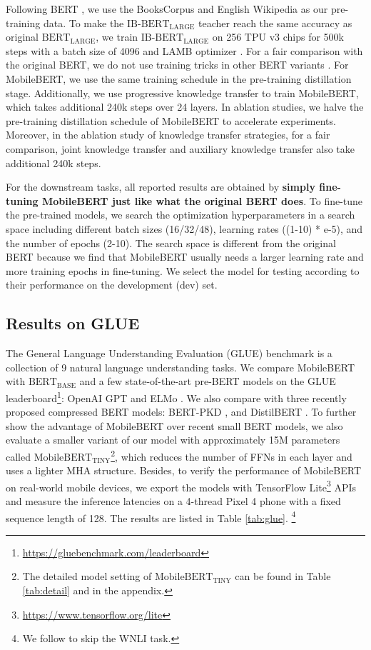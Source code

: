 \documentclass[11pt,a4paper]{article}
\begin{document}
Following BERT \citep{devlin2018bert}, we use the BooksCorpus \citep{zhu2015aligning} and English Wikipedia as our pre-training data. To make the $\text{IB-BERT}_\text{LARGE}$ teacher reach the same accuracy as original $\text{BERT}_\text{LARGE}$, we train $\text{IB-BERT}_\text{LARGE}$ on 256 TPU v3 chips for 500k steps with a batch size of 4096 and LAMB optimizer \citep{you2019large}. For a fair comparison with the original BERT, we do not use training tricks in other BERT variants \citep{liu2019roberta,joshi2019spanbert}.
For MobileBERT, we use the same training schedule in the pre-training distillation stage. Additionally, we use progressive knowledge transfer to train MobileBERT, which takes additional 240k steps over 24 layers.
In ablation studies, we halve the pre-training distillation schedule of MobileBERT to accelerate experiments. Moreover, in the ablation study of knowledge transfer strategies, for a fair comparison, joint knowledge transfer and auxiliary knowledge transfer also take additional 240k steps.

For the downstream tasks, all reported results are obtained by \textbf{simply fine-tuning 
MobileBERT just like what the original BERT does}. To fine-tune the pre-trained models, we search the optimization hyperparameters in a search space including different batch sizes (16/32/48), learning rates ((1-10) * e-5), and the number of epochs (2-10). The search space is different from the original BERT because we find that MobileBERT usually needs a larger learning rate and more training epochs in fine-tuning. We select the model for testing according to their performance on the development (dev) set.


\subsection{Results on GLUE}

The General Language Understanding Evaluation (GLUE) benchmark \citep{wang2018glue} is a collection of 9 natural language understanding tasks.
We compare MobileBERT with $\text{BERT}_\text{BASE}$ and a few state-of-the-art pre-BERT models on the GLUE leaderboard\footnote{\url{https://gluebenchmark.com/leaderboard}}: OpenAI GPT \citep{radford2018improving} and ELMo \citep{peters2018deep}. We also compare with three recently proposed compressed BERT models: BERT-PKD \citep{sun2019patient}, and DistilBERT \cite{sanh2019distilbert}.
To further show the advantage of MobileBERT over recent small BERT models, we also evaluate a smaller variant of our model with approximately 15M parameters called $\text{MobileBERT}_\text{TINY}$\footnote{The detailed model setting of $\text{MobileBERT}_\text{TINY}$ can be found in Table \ref{tab:detail} and in the appendix.}, which reduces the number of FFNs in each layer and uses a lighter MHA structure.
Besides, to verify the performance of MobileBERT on real-world mobile devices, we export the models with TensorFlow Lite\footnote{\url{https://www.tensorflow.org/lite}} APIs and measure the inference latencies on a 4-thread Pixel 4 phone with a fixed sequence length of 128. The results are listed in Table \ref{tab:glue}.
\footnote{We follow \citet{devlin2018bert} to skip the WNLI task. }
\end{document}
